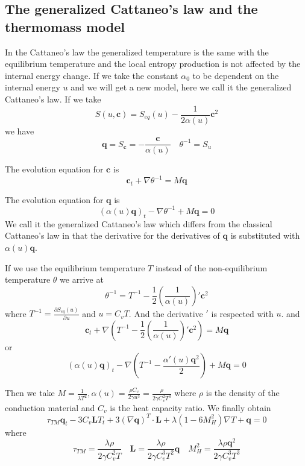 \documentclass[a4paper]{article}
\begin{document}
\subsection{The generalized Cattaneo's law and the thermomass model}
In the Cattaneo's law the generalized temperature is the same with the equilibrium temperature and the local entropy production is not affected by the internal energy change. If we take the constant $\alpha_0$ to be dependent on the internal energy $u$ and we will get a new model, here we call it the generalized Cattaneo's law.
If we take
\begin{equation}
S(u,\mathbf{c})=S_{eq}(u)-\frac{1}{2\alpha(u)} \mathbf{c}^2
\end{equation}
we have 
\begin{equation}
\mathbf{q} = S_{\mathbf{c}}=-\frac{ \mathbf{c}}{\alpha(u)} \quad \theta^{-1}=S_u
\end{equation}

The evolution equation for $\mathbf{c}$ is 
\begin{equation}
\mathbf{c}_t+\nabla \theta^{-1}=M \mathbf{q}
\end{equation}

The evolution equation for $\mathbf{q}$ is
\begin{equation}\label{eq_theta}
({\alpha(u)}\mathbf{q})_t-\nabla \theta^{-1}+M\mathbf{q}=0
\end{equation}
We call it the generalized Cattaneo's law which differs from the classical Cattaneo's law in that the derivative for the derivatives of $\mathbf{q}$ is substituted with ${\alpha(u)}\mathbf{q}$.

If we use the equilibrium temperature $T$ instead of the non-equilibrium temperature $\theta$ we arrive at
\begin{equation}
\theta^{-1}=T^{-1}-\frac{1}{2}(\frac{1}{\alpha(u)})'\mathbf{c}^2
\end{equation}
where $T^{-1}=\frac{\partial S_{eq}(u)}{\partial u}$ and $u=C_v T$. And the derivative $'$ is respected with $u$.
and
\begin{equation}
\mathbf{c}_t+\nabla(T^{-1}-\frac{1}{2}(\frac{1}{\alpha(u)})' \mathbf{c}^2)=M\mathbf{q}
\end{equation}
or
\begin{equation}\label{eq_Teq}
({\alpha(u)}{\mathbf{q}})_t-\nabla(T^{-1}- \frac{\alpha'(u)\mathbf{q}^2}{2})+M\mathbf{q}=0
\end{equation}

Then we take $M=\frac{1}{\lambda T^2}, \alpha(u)=\frac{\rho C_v}{2\gamma u^3}=\frac{\rho}{2\gamma C_v^2 T^3}$
where $\rho$ is the density of the conduction material and $C_v$ is the heat capacity ratio.
We finally obtain
\begin{equation}
\tau_{TM} \mathbf{q}_t-3C_v \mathbf{L}T_t+3(\nabla \mathbf{q})^T \cdot \mathbf{L}+\lambda(1-6M_H^2)\nabla T+\mathbf{q}=0
\end{equation}
where
\begin{equation}
\tau_{TM}=\frac{\lambda \rho}{2 \gamma C_v^2 T} \quad \mathbf{L}=\frac{\lambda \rho}{2 \gamma C_v^3 T^2}\mathbf{q} \quad M_H^2=\frac{\lambda \rho \mathbf{q}^2}{2\gamma C_v^3 T^3}
\end{equation}
\end{document}
